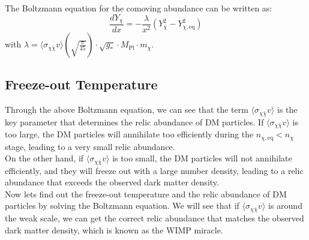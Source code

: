 \bigskip \noindent
\begin{theory}
    The Boltzmann equation for the comoving abundance can be written as:
    \[
        \frac{dY_\chi}{dx} = - \frac{\lambda}{x^2} (Y_\chi^2 - Y_{\chi,\mathrm{eq}}^2)
    \]
    with $\lambda = \langle \sigma_{\chi \bar{\chi}} v \rangle \left( \sqrt{\frac{\pi}{45}} \right) \cdot \sqrt{g_{*}} \cdot M_{\mathrm{Pl}} \cdot m_\chi$.
\end{theory}



\bigskip \noindent \bigskip \noindent \bigskip \noindent
\subsection{Freeze-out Temperature}
\begin{intuition}
    Through the above Boltzmann equation, we can see that the term $\langle \sigma_{\chi \bar{\chi}} v \rangle$ is the key parameter that determines the relic abundance of DM particles. If $\langle \sigma_{\chi \bar{\chi}} v \rangle$ is too large, the DM particles will annihilate too efficiently during the $n_{\chi,\mathrm{eq}} < n_\chi$ stage, leading to a very small relic abundance. \\

    On the other hand, if $\langle \sigma_{\chi \bar{\chi}} v \rangle$ is too small, the DM particles will not annihilate efficiently, and they will freeze out with a large number density, leading to a relic abundance that exceeds the observed dark matter density. \\

    Now lets find out the freeze-out temperature and the relic abundance of DM particles by solving the Boltzmann equation. We will see that if $\langle \sigma_{\chi \bar{\chi}} v \rangle$ is around the weak scale, we can get the correct relic abundance that matches the observed dark matter density, which is known as the WIMP miracle.
\end{intuition}

